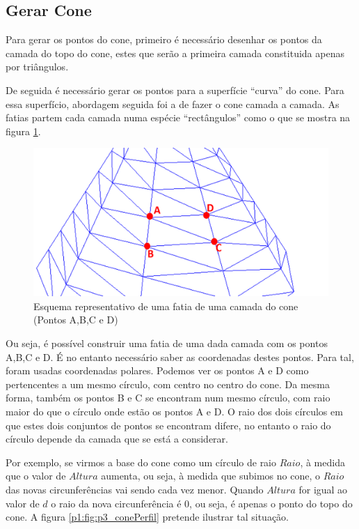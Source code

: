 \subsection{Gerar Cone}

Para gerar os pontos do cone, primeiro é necessário desenhar os pontos da camada do topo do cone, estes que serão a primeira camada constituida apenas por triângulos. 


De seguida é necessário gerar os pontos para a superfície ``curva'' do cone. Para essa superfício, abordagem seguida foi a de fazer o cone camada a camada. As fatias partem cada camada numa espécie ``rectângulos'' como o que se mostra na figura \ref{p1:fig:p3_seccaoCone_edit}.


\begin{figure}[<+htpb+>]
	\centering
	\includegraphics[scale=0.5]{imagens/p3_seccaoCone_edit.png}
	\caption{Esquema representativo de uma fatia de uma camada do cone (Pontos A,B,C e D)}
	\label{p1:fig:p3_seccaoCone_edit}
\end{figure}

Ou seja, é possível construir uma fatia de uma dada camada com os pontos A,B,C e D. É no entanto necessário saber as coordenadas destes pontos. Para tal, foram usadas coordenadas polares. Podemos ver os pontos A e D como pertencentes a um mesmo círculo, com centro no centro do cone. Da mesma forma, também os pontos B e C se encontram num mesmo círculo, com raio maior do que o círculo onde estão os pontos A e D. O raio dos dois círculos em que estes dois conjuntos de pontos se encontram difere, no entanto o raio do círculo depende da camada que se está a considerar. 


Por exemplo, se virmos a base do cone como um círculo de raio $Raio$, à medida que o valor de $Altura$ aumenta, ou seja, à medida que subimos no cone, o $Raio$ das novas circunferências vai sendo cada vez menor.
Quando $Altura$ for igual ao valor de $d$ o raio da nova circunferência é
0, ou seja, é apenas o ponto do topo do cone.  A figura \ref{p1:fig:p3_conePerfil} pretende ilustrar tal situação. 

